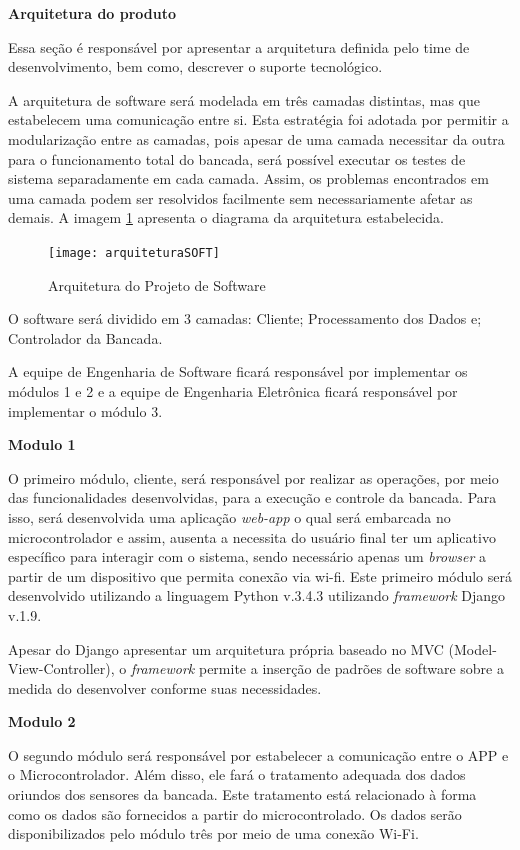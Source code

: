 \textbf{Arquitetura do produto}

	Essa seção é responsável por apresentar a arquitetura definida pelo time de desenvolvimento, bem como, descrever o suporte tecnológico.

	A arquitetura de software será modelada em três camadas distintas, mas que estabelecem uma comunicação entre si. Esta estratégia foi adotada por permitir a modularização entre as camadas, pois apesar de uma camada necessitar da outra para o funcionamento total do bancada, será possível executar os testes de sistema separadamente em cada camada. Assim, os problemas encontrados em uma camada podem ser resolvidos facilmente sem necessariamente afetar as demais. A imagem \ref{arquiteturaSOFT} apresenta o diagrama da arquitetura estabelecida.

	\begin{figure}[h]
		\centering
		\texttt{[image: arquiteturaSOFT]}
		\caption{Arquitetura do Projeto de Software}
		\label{arquiteturaSOFT}
	\end{figure}

	O software será dividido em 3 camadas:
	Cliente;
	Processamento dos Dados e;
	Controlador da Bancada.

	A equipe de Engenharia de Software ficará responsável por implementar os módulos 1 e 2 e a equipe de Engenharia Eletrônica ficará responsável por implementar o módulo 3.

	\textbf{Modulo 1}

	O primeiro módulo, cliente, será responsável por realizar as operações, por meio das funcionalidades desenvolvidas, para a execução e controle da bancada. Para isso, será desenvolvida uma aplicação \textit{web-app} o qual será embarcada no microcontrolador e assim, ausenta a necessita do usuário final ter um aplicativo específico para interagir com o sistema, sendo necessário apenas um \textit{browser} a partir de um dispositivo que permita conexão via wi-fi. Este primeiro módulo será desenvolvido utilizando a linguagem Python v.3.4.3 utilizando \textit{framework} Django v.1.9. 

	Apesar do Django apresentar um arquitetura própria baseado no MVC (Model-View-Controller), o \textit{framework} permite a inserção de padrões de software sobre a medida do desenvolver conforme suas necessidades.

	\textbf{Modulo 2}

	O segundo módulo será responsável por estabelecer a comunicação entre o APP e o Microcontrolador. Além disso, ele fará o tratamento adequada dos dados oriundos dos sensores da bancada. Este tratamento está relacionado à forma como os dados são fornecidos a partir do microcontrolado. Os dados serão disponibilizados pelo módulo três por meio de uma conexão Wi-Fi.

